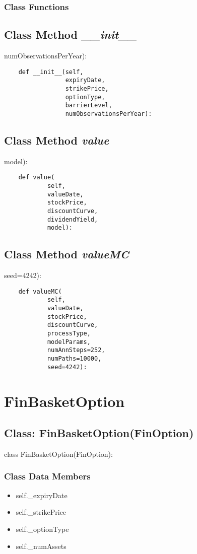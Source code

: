 \documentclass[twoside,11pt]{book}
\begin{document}
\subsubsection{Class Functions}

\subsection{Class Method {\it \_\_init\_\_}}
numObservationsPerYear):

\begin{lstlisting}
    def __init__(self,
                 expiryDate,
                 strikePrice,
                 optionType,
                 barrierLevel,
                 numObservationsPerYear):
\end{lstlisting}

\subsection{Class Method {\it value}}
model):

\begin{lstlisting}
    def value(
            self,
            valueDate,
            stockPrice,
            discountCurve,
            dividendYield,
            model):
\end{lstlisting}

\subsection{Class Method {\it valueMC}}
seed=4242):

\begin{lstlisting}
    def valueMC(
            self,
            valueDate,
            stockPrice,
            discountCurve,
            processType,
            modelParams,
            numAnnSteps=252,
            numPaths=10000,
            seed=4242):
\end{lstlisting}

\newpage
\section{FinBasketOption}

\subsection{Class: FinBasketOption(FinOption)}
class FinBasketOption(FinOption):

\subsubsection{Class Data Members}
\begin{itemize}
\item{self.\_expiryDate}
\item{self.\_strikePrice}
\item{self.\_optionType}
\item{self.\_numAssets}
\end{itemize}
\end{document}
